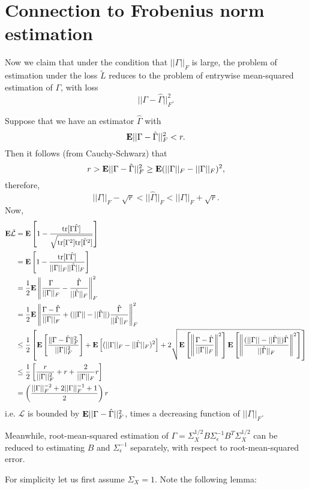 \documentclass[12pt]{article}
\begin{document}
\section{Connection to Frobenius norm estimation}

Now we claim that under the condition that $||\Gamma||_F$ is large,
the problem of estimation under the loss $\tilde{L}$ reduces to the
problem of entrywise mean-squared estimation of $\Gamma$, with loss
\[
||\Gamma - \hat{\Gamma}||^2_F.
\]

Suppose that we have an estimator $\hat{\Gamma}$ with
\[
\textbf{E} ||\Gamma - \hat{\Gamma}||^2_F < r.
\]
Then it follows (from Cauchy-Schwarz) that
\[
r > \textbf{E} ||\Gamma - \hat{\Gamma}||^2_F \geq \textbf{E}(||\Gamma||_F - ||\Gamma||_F)^2,
\]
therefore,
\[
||\Gamma||_F - \sqrt{r} < ||\hat{\Gamma}||_F < ||\Gamma||_F + \sqrt{r}.
\]
Now,
\begin{align*}
\textbf{E}\tilde{\mathcal{L}} &=
\textbf{E}\left[1 - \frac{\text{tr}[\Gamma \hat{\Gamma}]}{\sqrt{\text{tr}[\Gamma^2]\text{tr}[\hat{\Gamma}^2]}}\right]
\\&=
\textbf{E}\left[1 - \frac{\text{tr}[\Gamma \hat{\Gamma}]}{||\Gamma||_F||\hat{\Gamma}||_F}\right]
\\&= \frac{1}{2}\textbf{E}\left\|\frac{\Gamma}{||\Gamma||_F} - \frac{\hat{\Gamma}}{||\hat{\Gamma}||_F}\right\|^2_F
\\&= \frac{1}{2}\textbf{E}\left\|
\frac{\Gamma - \hat{\Gamma}}{||\Gamma||_F} + (||\Gamma|| - ||\hat{\Gamma}||)\frac{\hat{\Gamma}}{||\hat{\Gamma}||_F}
\right\|^2_F
\\&\leq\frac{1}{2}\left[\textbf{E}\left[
\frac{\|\Gamma - \hat{\Gamma}\|^2_F}{||\Gamma||_F^2}\right]
 + \textbf{E}\left[(||\Gamma||_F - ||\hat{\Gamma}||_F)^2\right]
 + 2 
\sqrt{\textbf{E}\left[
\left\|\frac{\Gamma - \hat{\Gamma}}{||\Gamma||_F}\right\|^2\right]
\textbf{E}\left[
\left\|\frac{(||\Gamma|| - ||\hat{\Gamma}||)\hat{\Gamma}}{||\hat{\Gamma}||_F}\right\|^2
\right]}
\right]
\\&\leq \frac{1}{2}\left[
\frac{r}{||\Gamma||_F^2} + r + \frac{2}{||\Gamma||_F}r\right]
\\&=
\left(\frac{||\Gamma||_F^{-2} + 2||\Gamma||_F^{-1} + 1}{2}\right)r
\end{align*}
i.e. $\mathcal{L}$ is bounded by $\textbf{E}||\Gamma - \hat{\Gamma}||^2_F$, times a decreasing function of $||\Gamma||_F$.

Meanwhile, root-mean-squared estimation of $\Gamma = \Sigma_X^{1/2}
B \Sigma_\epsilon^{-1} B^T \Sigma_X^{1/2}$ can be reduced to
estimating $B$ and $\Sigma_\epsilon^{-1}$ separately, with respect to
root-mean-squared error.

For simplicity let us first assume $\Sigma_X = 1$.  Note the following lemma:
\end{document}

